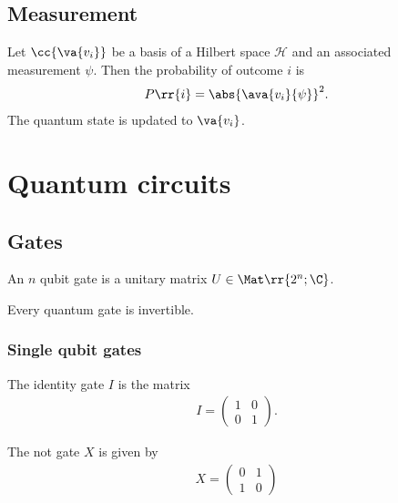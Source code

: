 \documentclass{article}
\begin{document}
\subsection{Measurement}
\label{sec:measurement}

\begin{definition}
	\label{def:probability-of-outcome}
	Let $\cc{\va{v_i}}$ be a basis of a Hilbert space $\mathcal{H}$ and an associated measurement $\psi$.
	Then the probability of outcome $i$ is
	\begin{align*}
		P\rr{i} = \abs{\ava{v_i}{\psi}}^2.
	\end{align*}
	The quantum state is updated to $\va{v_i}$.
\end{definition}

\section{Quantum circuits}
\label{sec:circuits}

\subsection{Gates}
\label{sec:gates}

\begin{definition}
	\label{def:single-qubit-gates}
	An $n$ qubit gate is a unitary matrix $U\in\Mat\rr{2^n;\C}$.
\end{definition}

\begin{corollary}
	Every quantum gate is invertible.
\end{corollary}

\subsubsection{Single qubit gates}
\label{sec:single-qubit-gates}

\begin{definition}
	\label{def:identity}
	The identity gate $I$ is the matrix
	\begin{align*}
		I = \begin{pmatrix}
			    1 & 0 \\ 0 & 1
		    \end{pmatrix}.
	\end{align*}
\end{definition}

\begin{definition}
	\label{def:not}
	The not gate $X$ is given by
	\begin{align*}
		X = \begin{pmatrix}
			    0 & 1 \\ 1 & 0
		    \end{pmatrix}
	\end{align*}
\end{definition}
\end{document}
